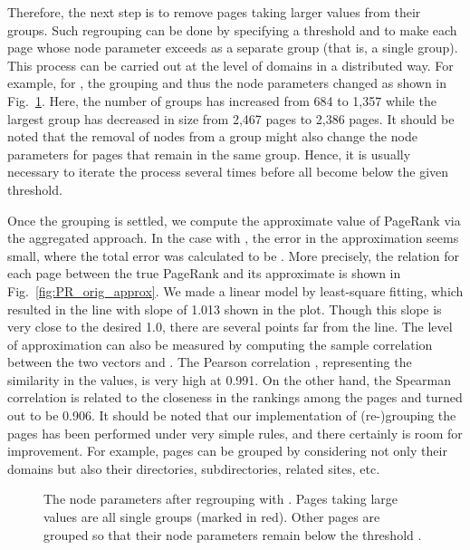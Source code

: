 \documentclass[11pt,draftcls,onecolumn]{IEEEtran}
\newcommand{\fig}[3]{\resizebox{#1}{#2}{\texttt{[image: \#3]}}}
\begin{document}
\begin{table}[t]
Therefore, the next step is to remove pages taking larger values from their groups.
Such regrouping can be done by specifying a threshold  and to make each page
whose node parameter exceeds  as a separate group (that is, a single group). 
This process can be carried out at the level of domains in a distributed way. 
For example, for , the grouping and thus the node parameters 
changed as shown in Fig.~\ref{fig:delta_i_04}. Here, the number of groups has 
increased from 684 to 1,357 while the largest group has decreased
in size from 2,467 pages to 2,386 pages.
It should be noted that the removal of nodes from a group might also change 
the node parameters for pages that remain in the same group. Hence,
it is usually necessary to iterate the process several times
before all  become below the given threshold. 

Once the grouping is settled, we compute the approximate value  of PageRank
via the aggregated approach. In the case with , the error in the 
approximation seems small, where the total error was calculated to be
.
More precisely, the relation for each page between the true PageRank  and its
approximate  is shown in Fig.~\ref{fig:PR_orig_approx}. 
We made a linear model by least-square fitting, which 
resulted in the line with slope of 1.013 shown in the plot. 
Though this slope is very close to the desired 1.0, there are several points far from the line. 
The level of approximation can also be measured 
by computing the sample correlation between the two vectors  and .
The Pearson correlation \cite{SneCoc:89}, representing the similarity in the values, is very high
at 0.991. On the other hand, the Spearman correlation
\cite{SneCoc:89} 
is related to the closeness
in the rankings among the pages and turned out to be 0.906. 
It should be noted that our implementation of (re-)grouping the pages has been performed 
under very simple rules, and there certainly is room for improvement. For example,
pages can be grouped by considering not only their domains but also 
their directories, subdirectories, related sites, etc. 



\begin{figure}[t]
  \centering
  \fig{9cm}{!}{delta_i_04.eps}
  \caption{The node parameters  after regrouping with .
     Pages taking large values are all single groups (marked in red). Other pages
     are grouped so that their node parameters remain below the threshold .}
  \label{fig:delta_i_04}
\end{figure}


\end{table}
\end{document}
